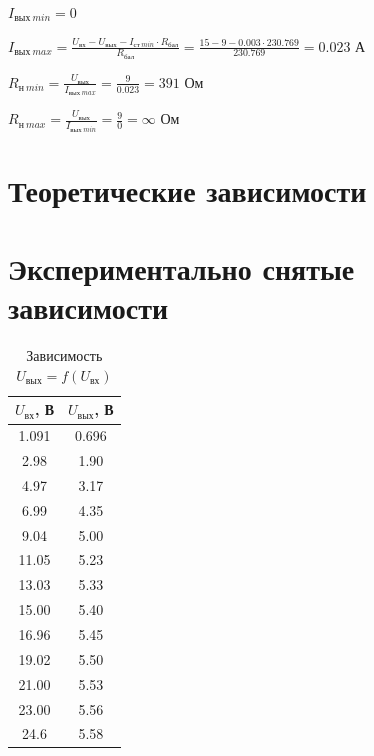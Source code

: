 $I_{\text{вых}\ min} = 0$

$I_{\text{вых}\ max} = \frac{U_\text{вх} - U_\text{вых} - I_{\text{ст}\ min} \cdot R_\text{бал}}{R_\text{бал}} = \frac{15 - 9 - 0.003 \cdot 230.769}{230.769} = 0.023$ А

$R_{\text{н}\ min} = \frac{U_\text{вых}}{I_{\text{вых}\ max}} = \frac{9}{0.023} = 391$ Ом

$R_{\text{н}\ max} = \frac{U_\text{вых}}{I_{\text{вых}\ min}} = \frac{9}{0} = \infty $ Ом 


\section{Теоретические зависимости}


\section{Экспериментально снятые зависимости}

\begin{table}[H]
	\begin{center}
	\caption{Зависимость $U_\text{вых} = f(U_\text{вх})$}
	\def\arraystretch{1.2}
		\begin{tabular}{|c|c|}
		\hline 
		$U_\text{вх}$, В & $U_\text{вых}$, В \\ 
		\hline 
		1.091 & 0.696 \\ 
		\hline 
		2.98 & 1.90 \\ 
		\hline 
		4.97 & 3.17 \\ 
		\hline 
		6.99 & 4.35 \\ 
		\hline 
		9.04 & 5.00 \\ 
		\hline 
		11.05 & 5.23 \\ 
		\hline 
		13.03 & 5.33 \\ 
		\hline 
		15.00 & 5.40 \\ 
		\hline 
		16.96 & 5.45 \\ 
		\hline 
		19.02 & 5.50 \\ 
		\hline 
		21.00 & 5.53 \\ 
		\hline 
		23.00 & 5.56 \\ 
		\hline 
		24.6 & 5.58 \\ 
		\hline 
		\end{tabular} 
		\label{tab:6:1}
	\end{center}
\end{table}

